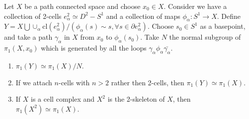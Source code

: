 \begin{prop} Let $X$ be a path connected space and choose $x_0\in X$. Consider we have a collection of 2-cells $e_\alpha^2\simeq D^2-S^1$ and a collection of maps $\phi_\alpha:S^1\rightarrow X$. Define $Y=X\bigcup \cup_{\alpha}\textrm{cl}(e_\alpha^2)/(\phi_\alpha(s)\sim s, \forall s\in \partial e_\alpha^2)$. Choose $s_0\in S^1$ as a basepoint, and take a path $\gamma_\alpha$ in $X$ from $x_0$ to $\phi_\alpha(s_0)$. Take $N$ the normal subgroup of $\pi_1(X,x_0)$ which is generated by all the loops $\gamma_\alpha \phi_\alpha \bar{\gamma_\alpha}$.
\begin{enumerate}[label=(\alph*)]
\item $\pi_1(Y)\simeq \pi_1(X)/N$.
\item If we attach $n$-cells with $n>2$ rather then 2-cells, then $\pi_1(Y)\simeq \pi_1(X)$.
\item If $X$ is a cell complex and $X^2$ is the 2-skeleton of $X$, then $\pi_1(X^2)\simeq \pi_1(X)$.
\end{enumerate}
\end{prop}
